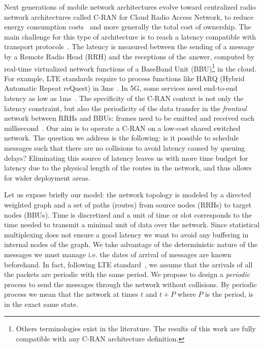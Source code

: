 \documentclass[10pt, conference, letterpaper]{IEEEtran}
\begin{document}
Next generations of mobile network architectures evolve toward centralized radio network architectures called C-RAN for Cloud Radio Access Network, to reduce energy consumption costs~\cite{mobile2011c} and more generally the total cost of ownership. The main challenge for this type of architecture is to reach a latency compatible with transport protocols~\cite{ieeep802}. The latency is measured between the sending of a message by a Remote Radio Head (RRH) and the receptions of the answer, computed by real-time virtualized network functions of a BaseBand Unit (BBU)\footnote{Others terminologies exist in the literature. The results of this work are fully compatible with any C-RAN architecture definition.} in the cloud. For example, LTE standards require to process functions like HARQ (Hybrid Automatic Repeat reQuest) in $3$ms~\cite{bouguen2012lte}. In 5G, some services need end-to-end latency as low as $1$ms~\cite{3gpp5g,boccardi2014five}. The specificity of the C-RAN context is not only the latency constraint, but also the periodicity of the data transfer in the \emph{frontaul} network between RRHs and BBUs: frames need to be emitted and received each millisecond~\cite{bouguen2012lte}.
Our aim is to operate a C-RAN on a low-cost shared switched network.
The question we address is the following: is it possible to schedule messages such that there are no collisions to avoid latency caused by queuing delays? 
Eliminating this source of latency leaves us with more time budget for latency due to the physical length of the routes in the network, and thus allows for wider deployment areas.


Let us expose briefly our model: the network topology is modeled by a directed weighted graph and a set of paths (routes) from source nodes (RRHs) to target nodes (BBUs). Time is discretized and a unit of time or slot corresponds to the time needed to transmit a minimal unit of data over the network. Since statistical multiplexing does not ensure a good latency we want to avoid any  buffering in internal nodes of the graph.  We take advantage of the deterministic nature of the messages we must manage i.e. the dates of arrival of messages are known beforehand. In fact, following LTE standard~\cite{bouguen2012lte}, we assume that the arrivals of all the packets are periodic with the same period. We propose to design a \emph{periodic} process to send the messages through the network without collisions. By periodic process we mean that the network at times $t$ and $t+P$ where $P$ is the period, is in the exact same state. 
\end{document}
